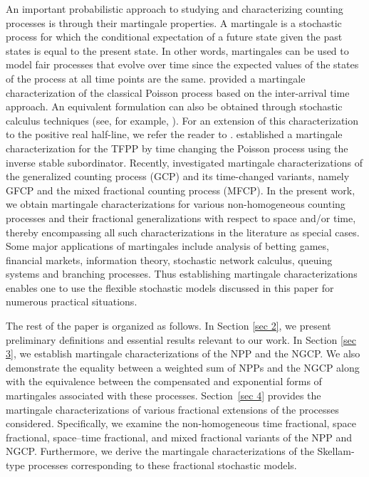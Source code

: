 \documentclass[11pt,oneside,reqno]{amsart}
\theoremstyle{definition}
\theoremstyle{remarkstyle}
\begin{document}
An important probabilistic approach to studying and characterizing counting processes is through their martingale properties. A martingale is a stochastic process for which the conditional expectation of a future state given the past states is equal to the present state. In other words, martingales can be used to model fair processes that evolve over time since the expected values of the states of the process at all time points are the same. \citet{Watanabe1964} provided a martingale characterization of the classical Poisson process based on the inter-arrival time approach. An equivalent formulation can also be obtained through stochastic calculus techniques (see, for example, \citet{Shreve2004}). For an extension of this characterization to the positive real half-line, we refer the reader to \citet{Bremaud1975}. \citet{Aletti2018} established a martingale characterization for the TFPP by time changing the Poisson process using the inverse stable subordinator. Recently, \citet{Dhillon2024} investigated martingale characterizations of the generalized counting process (GCP) and its time-changed variants, namely GFCP and the mixed fractional counting process (MFCP). In the present work, we obtain martingale characterizations for various non-homogeneous counting processes and their fractional generalizations with respect to space and/or time, thereby encompassing all such characterizations in the literature as special cases. Some major applications of martingales include analysis of betting games, financial markets, information theory, stochastic network calculus, queuing systems and branching processes. Thus establishing martingale characterizations enables one to use the flexible stochastic models discussed in this paper for numerous practical situations.  

The rest of the paper is organized as follows. In Section \ref{sec 2}, we present preliminary definitions and essential results relevant to our work. In Section \ref{sec 3}, we establish martingale characterizations of the NPP and the NGCP. We also demonstrate the equality between a weighted sum of NPPs and the NGCP along with the equivalence between the compensated and exponential forms of martingales associated with these processes. Section~\ref{sec 4} provides the martingale characterizations of various fractional extensions of the processes considered. Specifically, we examine the non-homogeneous time fractional, space fractional, space–time fractional, and mixed fractional variants of the NPP and NGCP. Furthermore, we derive the martingale characterizations of the Skellam-type processes corresponding to these fractional stochastic models.
\end{document}
